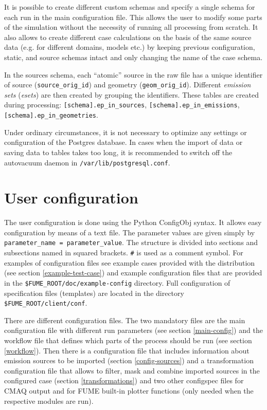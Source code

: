 \documentclass[a4paper,11pt]{article}
\begin{document}
It is possible to create different custom schemas and specify a single schema
for each run in the main configuration file. 
This allows the user to modify some parts of the
simulation without the necessity of running all processing from scratch. It also allows to create different case calculations on the basis of the same source data (e.g. for different domains, models etc.) by keeping previous configuration, static, and source schemas intact and only changing the name of the case schema.

In the sources schema, each ``atomic'' source in the raw file has a
unique identifier of source (\verb|source_orig_id|) and geometry
(\verb|geom_orig_id|). Different {\em emission sets} ({\em esets}) are then created by grouping the
identifiers. These tables are created during processing:
\verb|[schema].ep_in_sources|, \verb|[schema].ep_in_emissions|,
\verb|[schema].ep_in_geometries|.

Under ordinary circumstances, it is not necessary to optimize any
settings or configuration of the  Postgres database. In cases when the import of data
or saving data to tables takes too long, it is recommended to switch off
the autovacuum daemon in \verb|/var/lib/postgresql.conf|.

\section{User configuration}\label{user-configuration}
The user configuration is done using the Python ConfigObj syntax. It allows easy configuration by means of a text file. The parameter values are given simply by \verb|parameter_name = parameter_value|. The structure is divided into sections and subsections named in squared brackets. \texttt{\#} is used as a comment symbol. For examples of configuration files see example cases provided with the distribution (see section \ref{example-test-case}) and example configuration files that are provided in the \verb|$FUME_ROOT/doc/example-config| directory. Full configuration of specification files
(templates) are located in the directory \verb|$FUME_ROOT/client/conf|. 

There are different configuration files. The two mandatory files are the main configuration file with different run parameters (see section \ref{main-config}) and the workflow file that defines which parts of the process should be run (see section \ref{workflow}). Then there is a configuration file that includes information about emission sources to be imported (section \ref{config-sources}) and a transformation configuration file that allows to filter, mask and combine imported sources in the configured case (section \ref{transformations}) and two other configspec files for CMAQ output and for FUME built-in plotter functions (only needed when the respective modules are run).
\end{document}
